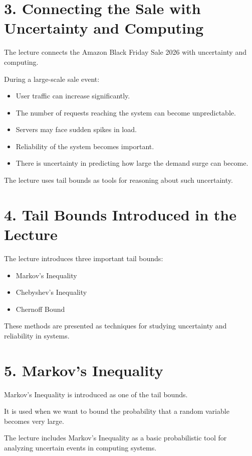 \documentclass[12pt]{article}
\begin{document}
\section*{3. Connecting the Sale with Uncertainty and Computing}

The lecture connects the Amazon Black Friday Sale 2026 with uncertainty and computing.

During a large-scale sale event:

\begin{itemize}
    \item User traffic can increase significantly.
    \item The number of requests reaching the system can become unpredictable.
    \item Servers may face sudden spikes in load.
    \item Reliability of the system becomes important.
    \item There is uncertainty in predicting how large the demand surge can become.
\end{itemize}

The lecture uses tail bounds as tools for reasoning about such uncertainty.

\section*{4. Tail Bounds Introduced in the Lecture}

The lecture introduces three important tail bounds:

\begin{itemize}
    \item Markov’s Inequality
    \item Chebyshev’s Inequality
    \item Chernoff Bound
\end{itemize}

These methods are presented as techniques for studying uncertainty and reliability in systems.

\section*{5. Markov’s Inequality}

Markov’s Inequality is introduced as one of the tail bounds.

It is used when we want to bound the probability that a random variable becomes very large.

The lecture includes Markov’s Inequality as a basic probabilistic tool for analyzing uncertain events in computing systems.
\end{document}
